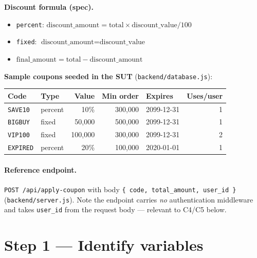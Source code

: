 \documentclass[11pt,a4paper]{article}
\newcommand{\code}[1]{\texttt{#1}}
\begin{document}
\noindent\textbf{Discount formula (spec).}
\begin{itemize}[nosep]
  \item \code{percent}: \(\text{discount\_amount} = \text{total} \times \text{discount\_value} / 100\)
  \item \code{fixed}: \(\text{discount\_amount} = \text{discount\_value}\)
  \item \(\text{final\_amount} = \text{total} - \text{discount\_amount}\)
\end{itemize}

\noindent\textbf{Sample coupons seeded in the SUT} (\code{backend/database.js}):

\begin{center}
\begin{tabular}{@{}l l r r l r@{}}
\toprule
Code & Type & Value & Min order & Expires & Uses/user \\
\midrule
\code{SAVE10}  & percent & 10\%        & 300{,}000 & 2099-12-31 & 1 \\
\code{BIGBUY}  & fixed   & 50{,}000    & 500{,}000 & 2099-12-31 & 1 \\
\code{VIP100}  & fixed   & 100{,}000   & 300{,}000 & 2099-12-31 & 2 \\
\code{EXPIRED} & percent & 20\%        & 100{,}000 & 2020-01-01 & 1 \\
\bottomrule
\end{tabular}
\end{center}

\paragraph{Reference endpoint.} \code{POST /api/apply-coupon} with body
\code{\{ code, total\_amount, user\_id \}} (\code{backend/server.js}). Note the
endpoint carries \emph{no} authentication middleware and takes \code{user\_id}
from the request body --- relevant to C4/C5 below.

\section{Step 1 --- Identify variables}
\end{document}
